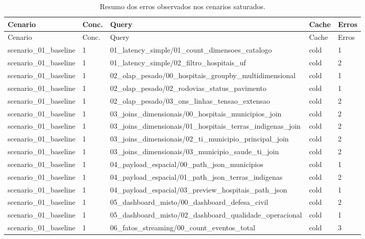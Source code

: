 {
\footnotesize
\setlength{\tabcolsep}{4pt}
\renewcommand{\arraystretch}{1.15}
\begin{longtable}{p{}p{}p{}p{}p{}}
\caption{Resumo dos erros observados nos cenarios saturados.}\\
\toprule
Cenario & Conc. & Query & Cache & Erros \\
\midrule
\endfirsthead
\toprule
Cenario & Conc. & Query & Cache & Erros \\
\midrule
\endhead
scenario\_01\_baseline & 1 & 01\_latency\_simple/01\_count\_dimensoes\_catalogo & cold & 1 \\
scenario\_01\_baseline & 1 & 01\_latency\_simple/02\_filtro\_hospitais\_uf & cold & 2 \\
scenario\_01\_baseline & 1 & 02\_olap\_pesado/00\_hospitais\_groupby\_multidimensional & cold & 1 \\
scenario\_01\_baseline & 1 & 02\_olap\_pesado/02\_rodovias\_status\_pavimento & cold & 1 \\
scenario\_01\_baseline & 1 & 02\_olap\_pesado/03\_ons\_linhas\_tensao\_extensao & cold & 2 \\
scenario\_01\_baseline & 1 & 03\_joins\_dimensionais/00\_hospitais\_municipios\_join & cold & 2 \\
scenario\_01\_baseline & 1 & 03\_joins\_dimensionais/01\_hospitais\_terras\_indigenas\_join & cold & 2 \\
scenario\_01\_baseline & 1 & 03\_joins\_dimensionais/02\_ti\_municipio\_principal\_join & cold & 2 \\
scenario\_01\_baseline & 1 & 03\_joins\_dimensionais/03\_municipio\_saude\_ti\_join & cold & 2 \\
scenario\_01\_baseline & 1 & 04\_payload\_espacial/00\_path\_json\_municipios & cold & 1 \\
scenario\_01\_baseline & 1 & 04\_payload\_espacial/01\_path\_json\_terras\_indigenas & cold & 2 \\
scenario\_01\_baseline & 1 & 04\_payload\_espacial/03\_preview\_hospitais\_path\_json & cold & 1 \\
scenario\_01\_baseline & 1 & 05\_dashboard\_misto/00\_dashboard\_defesa\_civil & cold & 2 \\
scenario\_01\_baseline & 1 & 05\_dashboard\_misto/02\_dashboard\_qualidade\_operacional & cold & 1 \\
scenario\_01\_baseline & 1 & 06\_fatos\_streaming/00\_count\_eventos\_total & cold & 3 \\

\end{longtable}}
